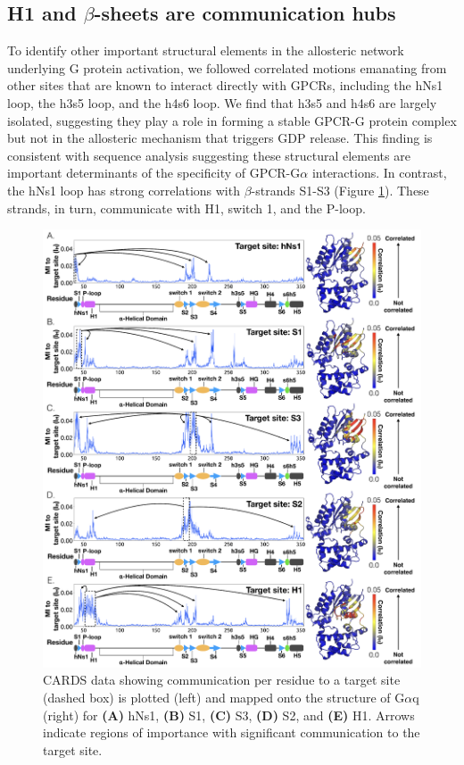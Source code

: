 \documentclass[../main.tex]{subfiles}
\begin{document}
    \subsection{H1 and $\beta$-sheets are communication hubs}
        To identify other important structural elements in the allosteric network underlying G protein activation, we followed correlated motions emanating from other sites that are known to interact directly with GPCRs, including the hNs1 loop, the h3s5 loop, and the h4s6 loop\cite{Oldham:2008cr}. We find that h3s5 and h4s6 are largely isolated, suggesting they play a role in forming a stable GPCR-G protein complex but not in the allosteric mechanism that triggers GDP release. This finding is consistent with sequence analysis suggesting these structural elements are important determinants of the specificity of GPCR-G$\alpha$ interactions\cite{Flock:2017bm}. In contrast, the hNs1 loop has strong correlations with $\beta$-strands S1-S3 (Figure \ref{fig:ch4-fig7}). These strands, in turn, communicate with H1, switch 1, and the P-loop.

        \begin{figure}[!htb] %
            \centering
            \includegraphics[width=5.6in]{ch4-fig7.png}
            \caption[Allosteric network connecting hNs1 motion to the nucleotide-binding site via the β-sheets.]
                {CARDS data showing communication per residue to a target site (dashed box) is plotted (left) and mapped onto the structure of G$\alpha$q (right) for \textbf{(A)} hNs1, \textbf{(B)} S1, \textbf{(C)} S3, \textbf{(D)} S2, and \textbf{(E)} H1. Arrows indicate regions of importance with significant communication to the target site.}
            \label{fig:ch4-fig7}
        \end{figure}
\end{document}
